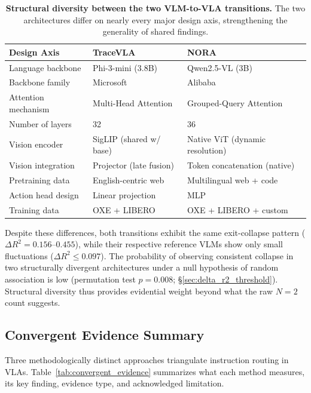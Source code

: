 \begin{table}[h]
\centering
\caption{\textbf{Structural diversity between the two VLM-to-VLA transitions.} The two architectures differ on nearly every major design axis, strengthening the generality of shared findings.}
\label{tab:arch_diversity}
\small
\begin{tabular}{@{}lll@{}}
\toprule
\textbf{Design Axis} & \textbf{TraceVLA} & \textbf{NORA} \\
\midrule
Language backbone & Phi-3-mini (3.8B) & Qwen2.5-VL (3B) \\
Backbone family & Microsoft & Alibaba \\
Attention mechanism & Multi-Head Attention & Grouped-Query Attention \\
Number of layers & 32 & 36 \\
Vision encoder & SigLIP (shared w/ base) & Native ViT (dynamic resolution) \\
Vision integration & Projector (late fusion) & Token concatenation (native) \\
Pretraining data & English-centric web & Multilingual web + code \\
Action head design & Linear projection & MLP \\
Training data & OXE + LIBERO & OXE + LIBERO + custom \\
\bottomrule
\end{tabular}
\end{table}

Despite these differences, both transitions exhibit the same exit-collapse pattern ($\Delta R^2 = 0.156$--$0.455$), while their respective reference VLMs show only small fluctuations ($\Delta R^2 \leq 0.097$).
The probability of observing consistent collapse in two structurally divergent architectures under a null hypothesis of random association is low (permutation test $p = 0.008$; \S\ref{sec:delta_r2_threshold}).
Structural diversity thus provides evidential weight beyond what the raw $N = 2$ count suggests.

\subsection{Convergent Evidence Summary}
Three methodologically distinct approaches triangulate instruction routing in VLAs.
Table~\ref{tab:convergent_evidence} summarizes what each method measures, its key finding, evidence type, and acknowledged limitation.

